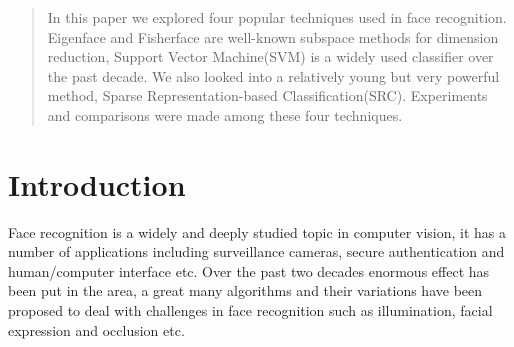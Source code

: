 \documentclass[conference]{IEEEtran}
\begin{document}
\begin{abstract}
In this paper we explored four popular techniques used in face recognition. Eigenface and Fisherface are well-known subspace methods for dimension reduction, Support Vector Machine(SVM) is a widely used classifier over the past decade. We also looked into a relatively young but very powerful method, Sparse Representation-based Classification(SRC). Experiments and comparisons were made among these four techniques. 
\end{abstract}





%
\IEEEpeerreviewmaketitle



\section{Introduction}
Face recognition is a widely and deeply studied topic in computer vision, it has a number of applications including surveillance cameras, secure authentication and human/computer interface etc. Over the past two decades enormous effect has been put in the area, a great many algorithms and their variations have been proposed to deal with challenges in face recognition such as illumination, facial expression and occlusion etc. 
\end{document}
